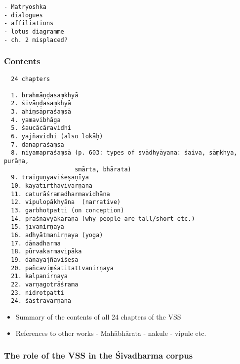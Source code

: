 \documentclass[]{article}
\providecommand{\tightlist}{%
  \setlength{\itemsep}{0pt}\setlength{\parskip}{0pt}}
\begin{document}
\begin{verbatim}
- Matryoshka 
- dialogues
- affiliations
- lotus diagramme
- ch. 2 misplaced? 
\end{verbatim}

\hypertarget{contents}{%
\subsubsection{Contents}\label{contents}}

\begin{verbatim}
  24 chapters

  1. brahmāṇḍasaṃkhyā 
  2. śivāṇḍasaṃkhyā 
  3. ahiṃsāpraśaṃsā 
  4. yamavibhāga
  5. śaucācāravidhi
  6. yajñavidhi (also lokāḥ)
  7. dānapraśaṃsā 
  8. niyamapraśaṃsā (p. 603: types of svādhyāyana: śaiva, sāṃkhya, purāṇa,
                    smārta, bhārata)
  9. traiguṇyaviśeṣaṇīya
  10. kāyatīrthavivarṇana
  11. caturāśramadharmavidhāna 
  12. vipulopākhyāna  (narrative)
  13. garbhotpatti (on conception)
  14. praśnavyākaraṇa (why people are tall/short etc.)
  15. jīvanirṇaya 
  16. adhyātmanirṇaya (yoga) 
  17. dānadharma
  18. pūrvakarmavipāka
  19. dānayajñaviśeṣa
  20. pañcaviṃśatitattvanirṇaya
  21. kalpanirṇaya
  22. varṇagotrāśrama
  23. nidrotpatti
  24. śāstravarṇana
\end{verbatim}

\begin{itemize}
\tightlist
\item
  Summary of the contents of all 24 chapters of the VSS
\item
  References to other works - Mahābhārata - nakule - vipule etc.
\end{itemize}

\hypertarget{the-role-of-the-vss-in-the-ux15bivadharma-corpus}{%
\subsubsection{The role of the VSS in the Śivadharma
corpus}\label{the-role-of-the-vss-in-the-ux15bivadharma-corpus}}
\end{document}
